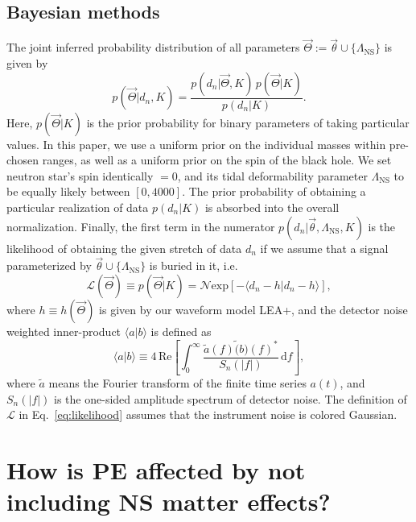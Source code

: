 \documentclass[aps,prd,amsmath,floats,floatfix, twocolumn,
superscriptaddress,nofootinbib,showpacs]{revtex4-1}
\newcommand{\D}{\mathrm{d}}
\newcommand{\lambdans}{\Lambda_\mathrm{NS}}
\newcommand{\LL}{\mathcal{L}}
\begin{document}
\subsection{Bayesian methods}\label{s2:bayesian}

The joint inferred probability distribution of all parameters 
$\vec{\Theta}:=\vec{\theta}\cup\{\lambdans\}$ 
is given by
\begin{equation}
 p(\vec{\Theta} | d_n, K) = \dfrac{p(d_n|\vec{\Theta}, K)\,p(\vec{\Theta} | K)}{p(d_n|K)}.
\end{equation}
Here, $p(\vec{\Theta} | K)$ is the prior probability for binary parameters of taking 
particular values. In this paper, we use a uniform prior on the individual masses within 
pre-chosen ranges, as well as a uniform prior on the spin of the black hole. We set neutron star's
spin identically $=0$, and its tidal deformability parameter $\lambdans$ to be equally likely
between $[0, 4000]$. The prior probability of obtaining a particular realization of data
$p(d_n|K)$ is absorbed into the overall normalization. Finally, the first term in the numerator
$p(d_n|\vec{\theta}, \lambdans, K)$ is the likelihood of obtaining the given stretch of 
data $d_n$ if we assume that a signal parameterized by $\vec{\theta}\cup\{\lambdans\}$ is buried
in it, i.e.
\begin{equation}\label{eq:likelihood}
 \LL(\vec{\Theta}) \equiv p(\vec{\Theta} | K) = \mathcal{N} \mathrm{exp}[- \langle d_n - h | d_n - h\rangle ],
\end{equation}
where $h\equiv h(\vec{\Theta})$ is given by our waveform model LEA+, and the
detector noise weighted inner-product $\langle a|b\rangle$ is defined as 
$$
\langle a|b\rangle \equiv 4\,\mathrm{Re}\left[\int_0^\infty \dfrac{\tilde{a}(f) \tilde(b)(f)^*}{S_n(|f|)}\,\D f\right],
$$
where $\tilde{a}$ means the Fourier transform of the finite time series $a(t)$, and 
$S_n(|f|)$ is the one-sided amplitude spectrum of detector noise. The definition of $\LL$ in 
Eq.~\ref{eq:likelihood} assumes that the instrument noise is colored Gaussian. 



\section{How is PE affected by not including NS matter effects?}\label{s1:PEwithnoNS}
\end{document}
